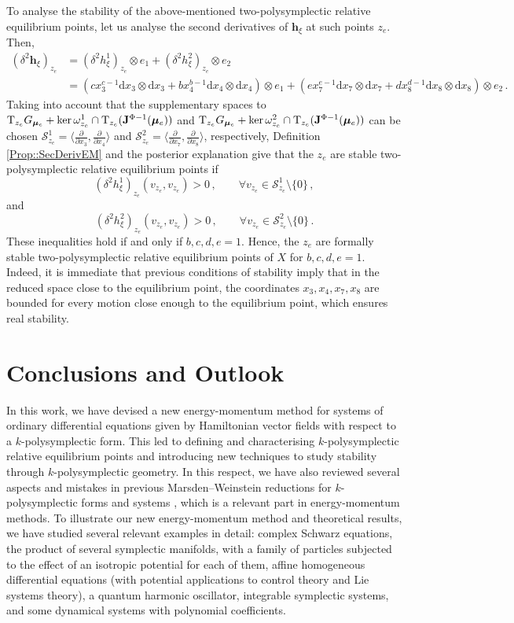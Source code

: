 \documentclass[11pt]{article}
\theoremstyle{plain}
\theoremstyle{definition}
\newcommand{\T}{\mathrm{T}}
\renewcommand{\d}{\mathrm{d}}
\newcommand{\parder}[2]{\frac{\partial #1}{\partial #2}}
\def\d{\mathrm{d}}
\numberwithin{equation}{section}
\begin{document}
To analyse the stability of the above-mentioned two-polysymplectic relative equilibrium points, let us analyse the second derivatives of $\boldsymbol{h}_\xi$ at such points $z_e$. Then,
\begin{align*}
    (\delta^2 \bm h_{\xi})_{z_e} &= (\delta^2 h^1_{\xi})_{z_e}\otimes e_1+ (\delta^2 h^2_{\xi})_{z_e}\otimes e_2\\
    &=\left( cx_3^{c-1}\d x_3\otimes \d x_3 + bx_4^{b-1}\d x_4\otimes \d x_4\right)\otimes e_1+\left(ex_7^{e-1}\d x_7\otimes \d x_7 + d x_8^{d-1} \d x_8\otimes \d x_8\right)\otimes e_2\,.
\end{align*}
Taking into account that the supplementary spaces to $\T_{z_e}G_{\bm\mu_e}+ \ker \omega^1_{z_e}\cap \T_{z_e}({\bf J}^{\Phi-1}(\bm \mu_e))$ and $\T_{z_e}G_{\bm\mu_e}+ \ker \omega^2_{z_e}\cap \T_{z_e}({\bf J}^{\Phi-1}(\bm \mu_e))$ can be chosen $\mathcal{S}_{z_e}^1=\langle \parder{}{x_3},\parder{}{x_4}\rangle $ and $\mathcal{S}^2_{z_e}=\langle \parder{}{x_7},\parder{}{x_8}\rangle$, respectively, Definition \ref{Prop::SecDerivEM} and the posterior explanation give that the $z_e$ are stable two-polysymplectic relative equilibrium points if
\[
(\delta^2h^1_\xi)_{z_e}(v_{z_e},v_{z_e}) > 0\,,\qquad \forall v_{z_e}\in \mathcal{S}^1_{z_e}\setminus\{0\}\,,
\]
and
\[
(\delta^2h^2_\xi)_{z_e}(v_{z_e},v_{z_e}) > 0\,,\qquad \forall v_{z_e}\in \mathcal{S}^2_{z_e}\setminus\{0\}\,.
\]
These inequalities hold if and only if $b,c,d,e=1$. Hence, the $z_e$ are formally stable two-polysymplectic relative equilibrium points of $X$ for $b,c,d,e=1$.  Indeed, it is immediate that previous conditions of stability imply that in the reduced space close to the equilibrium point, the coordinates $x_3,x_4,x_7,x_8$ are bounded for every motion close enough to the equilibrium point, which ensures real stability.


\section{Conclusions and Outlook}
\label{Sec::Conclusions}

In this work, we have devised a new energy-momentum method for systems of ordinary differential equations given by Hamiltonian vector fields with respect to a $k$-polysymplectic form. This led to defining and characterising $k$-polysymplectic relative equilibrium points and introducing new techniques to study stability through $k$-polysymplectic geometry. In this respect, we have also reviewed several aspects and mistakes in previous Marsden--Weinstein reductions for $k$-polysymplectic forms and systems \cite{Bla_19,GM_23, MRS_04,MRSV_15}, which is a relevant part in energy-momentum methods. To illustrate our new energy-momentum method and theoretical results, we have studied several relevant examples in detail: complex Schwarz equations, the product of several symplectic manifolds, with a family of particles subjected to the effect of an isotropic potential for each of them, affine homogeneous differential equations (with potential applications to control theory and Lie systems theory), a quantum harmonic oscillator, integrable symplectic systems, and some dynamical systems with polynomial coefficients.
\end{document}
